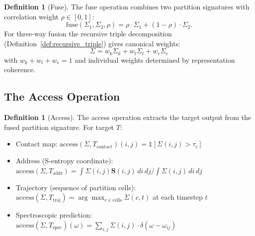 \documentclass[11pt,twocolumn,a4paper]{article}
\theoremstyle{definition}
\newtheorem{definition}[theorem]{Definition}
\theoremstyle{remark}
\newcommand{\Scoord}{\mathbf{S}}
\newcommand{\Sig}{\Sigma}
\begin{document}
\begin{definition}[Fuse]
\label{def:fuse}
The fuse operation combines two partition signatures with correlation weight $\rho \in [0, 1]$:
\begin{equation}
\mathrm{fuse}(\Sig_1, \Sig_2, \rho) = \rho \cdot \Sig_1 + (1 - \rho) \cdot \Sig_2.
\end{equation}
For three-way fusion the recursive triple decomposition (Definition~\ref{def:recursive_triple}) gives canonical weights:
\begin{equation}
\Sig = w_k \Sig_k + w_t \Sig_t + w_e \Sig_e
\end{equation}
with $w_k + w_t + w_e = 1$ and individual weights determined by representation coherence.
\end{definition}

\subsection{The Access Operation}

\begin{definition}[Access]
\label{def:access}
The access operation extracts the target output from the fused partition signature. For target $T$:
\begin{itemize}[nosep]
    \item Contact map: $\mathrm{access}(\Sig, T_{\mathrm{contact}})(i, j) = \mathbb{1}[\Sig(i, j) > \tau_c]$
    \item Address (S-entropy coordinate): $\mathrm{access}(\Sig, T_{\mathrm{addr}}) = \int \Sig(i, j) \Scoord(i, j) \, di\, dj / \int \Sig(i, j) \, di\, dj$
    \item Trajectory (sequence of partition cells): $\mathrm{access}(\Sig, T_{\mathrm{traj}}) = \arg\max_{c \in \mathrm{cells}} \Sig(c, t)$ at each timestep $t$
    \item Spectroscopic prediction: $\mathrm{access}(\Sig, T_{\mathrm{spec}})(\omega) = \sum_{i,j} \Sig(i,j) \cdot \delta(\omega - \omega_{ij})$
\end{itemize}
\end{definition}
\end{document}
